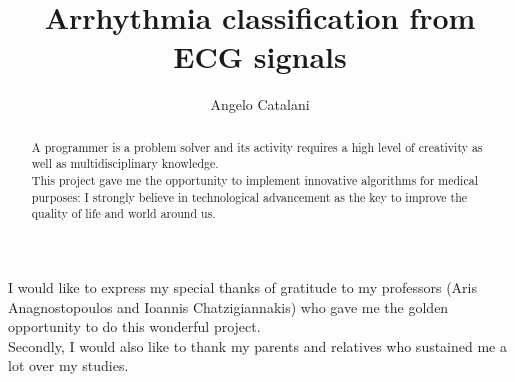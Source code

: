 \documentclass[LaM,binding=0.6cm]{sapthesis}
\title{Arrhythmia classification from ECG signals}
\author{Angelo Catalani}
\begin{document}
\frontmatter

\maketitle

\dedication{Dedicated to\\ my parents}

\begin{abstract}
A programmer is a problem solver and its activity requires a high level of creativity as well as multidisciplinary knowledge.\\This project gave me the opportunity to implement innovative algorithms for medical purposes: I strongly believe in technological advancement as the key to improve the quality of life and world around us.
\end{abstract}

\begin{acknowledgments}
I would like to express my special thanks of gratitude to my professors (Aris Anagnostopoulos and Ioannis Chatzigiannakis) who gave me the golden opportunity to do this wonderful project.\\Secondly, I would also like to thank my parents and relatives who sustained me a lot over my studies.
\end{acknowledgments}

\tableofcontents

\listoffigures

\mainmatter
\end{document}

